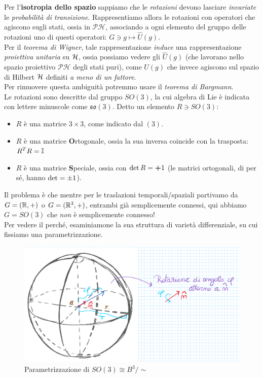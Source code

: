 \documentclass[../../FisicaTeorica.tex]{subfiles}
\begin{document}
Per l'\textbf{isotropia dello spazio} sappiamo che le \textit{rotazioni} devono lasciare \textit{invariate} le \textit{probabilità di transizione}. Rappresentiamo allora le rotazioni con operatori che agiscono sugli stati, ossia in $\mathcal{PH}$, associando a ogni elemento del gruppo delle rotazioni uno di questi operatori: $G \ni g \mapsto \hat{U}(g)$.\\
Per il \textit{teorema di Wigner}, tale rappresentazione \textit{induce} una rappresentazione \textit{proiettiva} \textit{unitaria} su $\mathcal{H}$, ossia possiamo vedere gli $\hat{U}(g)$ (che lavorano nello spazio proiettivo $\mathcal{PH}$ degli stati puri), come $U(g)$ che invece agiscono sul  spazio di Hilbert $\mathcal{H}$ definiti \textit{a meno di un fattore}.\\
Per rimuovere questa ambiguità potremmo usare il \textit{teorema di Bargmann}.\\
Le rotazioni sono descritte dal gruppo $SO(3)$, la cui algebra di Lie è indicata con lettere minuscole come $\mathfrak{so}(3)$. Detto un elemento $R\ni SO(3)$:
\begin{itemize}
\item $R$ è una matrice $3\times 3$, come indicato dal $(3)$.
\item $R$ è una matrice \textbf{O}rtogonale, ossia la sua inversa coincide con la trasposta: $R^T R = \mathbb{I}$
\item $R$ è una matrice \textbf{S}peciale, ossia con $\operatorname{det}R=\bm{+}1$ (le matrici ortogonali, di per sé, hanno $\operatorname{det} = \pm 1$).
\end{itemize}
Il problema è che mentre per le traslazioni temporali/spaziali partivamo da $G=(\mathbb{R},+)$ o $G=(\mathbb{R}^3,+)$, entrambi già semplicemente connessi, qui abbiamo $G=SO(3)$ che \textit{non} è semplicemente connesso!\\
Per vedere il perché, esaminiamone la sua struttura di varietà differenziale, su cui fissiamo una parametrizzazione.
\begin{figure}[H]
\centering
\includegraphics[scale=0.2]{Immagini/23_11/image001.png}
\caption{Parametrizzazione di $SO(3)\cong B^3/\sim$}
\end{figure}
\end{document}
